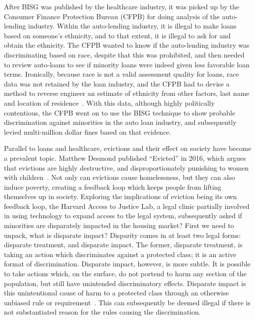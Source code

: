 \par After BISG was published by the healthcare industry, it was picked up by the Consumer Finance Protection Bureau (CFPB) for doing analysis of the auto-lending industry.  Within the auto-lending industry, it is illegal to make loans based on someone’s ethnicity, and to that extent, it is illegal to ask for and obtain the ethnicity.  The CFPB wanted to know if the auto-lending industry was discriminating based on race, despite that this was prohibited, and then needed to review auto-loans to see if minority loans were indeed given less favorable loan terms.  Ironically, because race is not a valid assessment quality for loans, race data was not retained by the loan industry, and the CFPB had to devise a method to reverse engineer an estimate of ethnicity from other factors, last name and location of residence~\citep{ARTICLE:1}.  With this data, although highly politically contentious, the CFPB went on to use the BISG technique to show probable discrimination against minorities in the auto loan industry, and subsequently levied multi-million dollar fines based on that evidence.

\par Parallel to loans and healthcare, evictions and their effect on society have become a prevalent topic.  Matthew Desmond published “Evicted” in 2016, which argues that evictions are highly destructive, and disproportionately punishing to women with children~\citep{BOOK:6}.  Not only can evictions cause homelessness, but they can also induce poverty, creating a feedback loop which keeps people from lifting themselves up in society.  Exploring the implications of eviction being its own feedback loop, the Harvard Access to Justice Lab, a legal clinic partially involved in using technology to expand access to the legal system, subsequently asked if minorities are disparately impacted in the housing market?  First we need to unpack, what is disparate impact?  Disparity comes in at least two legal forms: disparate treatment, and disparate impact.  The former, disparate treatment, is taking an action which discriminates against a protected class; it is an active format of discrimination.  Disparate impact, however, is more subtle.  It is possible to take actions which, on the surface, do not portend to harm any section of the population, but still have unintended discriminatory effects.  Disparate impact is this unintentional cause of harm to a protected class through an otherwise unbiased rule or requirement~\citep{WEBSITE:5}.  This can subsequently be deemed illegal if there is not substantiated reason for the rules causing the discrimination.

